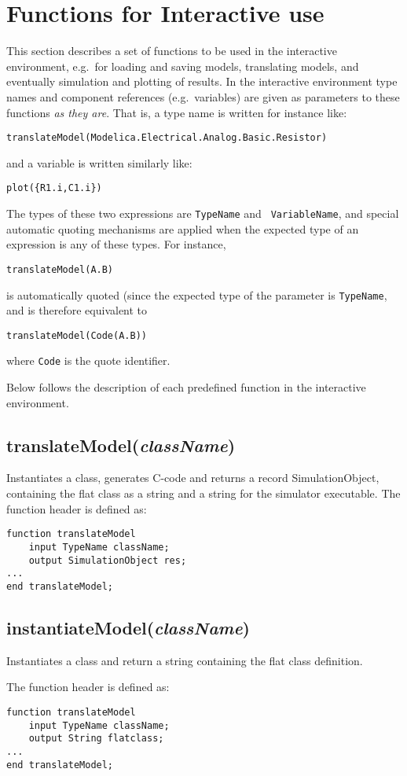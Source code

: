 \documentclass{report}
\newcommand{\func}[1]{\section{#1}}
\newcommand{\funcbegin}{}
\begin{document}
\chapter{Functions for Interactive use}
This section describes a set of functions to be used in the
interactive environment, e.g.\ for loading and saving models,
translating models, and eventually simulation and plotting of results.
In the interactive environment type names and component references
(e.g.\ variables) are given as parameters to these functions \emph{as
they are}. That is, a type name is written for instance like:
\begin{verbatim}
translateModel(Modelica.Electrical.Analog.Basic.Resistor)
\end{verbatim}
and a variable is written similarly like:
\begin{verbatim}
plot({R1.i,C1.i})
\end{verbatim}
The types of these two expressions are {\tt TypeName} and {\tt
VariableName}, and special automatic quoting mechanisms are applied
when the expected type of an expression is any of these types.
For instance,
\begin{verbatim}
translateModel(A.B)
\end{verbatim}
is automatically quoted (since the expected type of the parameter is
{\tt TypeName}, and is therefore equivalent to
\begin{verbatim}
translateModel(Code(A.B))
\end{verbatim}
where {\tt Code} is the quote identifier.

Below follows the description of each predefined function in the
interactive environment.
\funcbegin
\func{translateModel(\emph{className})}
Instantiates a class, generates C-code and returns a record
SimulationObject, containing the flat class as a string and a string
for the simulator executable. 
The function header is defined as:
\begin{verbatim}
function translateModel
    input TypeName className;
    output SimulationObject res;
...
end translateModel;
\end{verbatim}

\func{instantiateModel(\emph{className})}
Instantiates a class and return a string
containing the flat class definition. 

The function header is defined as:
\begin{verbatim}
function translateModel
    input TypeName className;
    output String flatclass;
...
end translateModel;
\end{verbatim}
\end{document}
